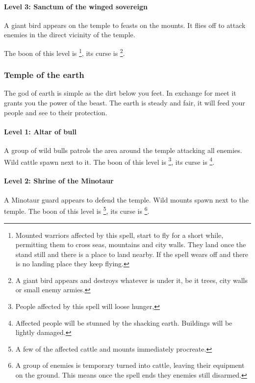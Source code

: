 \documentclass[a4paper]{book}
\begin{document}
			\paragraph{Level 3: Sanctum of the winged sovereign}
				A giant bird appears on the temple to feasts on the mounts.
				It flies off to attack enemies in the direct vicinity of the temple.

				The boon of this level is \footnote{
					Mounted warriors affected by this spell,
					start to fly for a short while,
					permitting them to cross seas, mountains and city walls.
					They land once the stand still and there is a place to land nearby.
					If the spell wears off and there is no landing place they keep flying.
				},
				its curse is \footnote{
					A giant bird appears and destroys whatever is under it,
					be it trees, city walls or small enemy armies.
				}.

		\subsubsection{Temple of the earth}
			The god of earth is simple as the dirt below you feet.
			In exchange for meet it grants you the power of the beast.
			The earth is steady and fair, it will feed your people and see to their protection.

			\paragraph{Level 1: Altar of bull}
				A group of wild bulls patrols the area around the temple attacking
				all enemies.
				Wild cattle spawn next to it.
				The boon of this level is \footnote{
					People affected by this spell will loose hunger,
				},
				its curse is \footnote{
					Affected people will be stunned by the shacking earth.
					Buildings will be lightly damaged.
				}.

			\paragraph{Level 2: Shrine of the Minotaur}
				A Minotaur guard appears to defend the temple.
				Wild mounts spawn next to the temple.
				The boon of this level is \footnote{
					A few of the affected cattle and mounts immediately procreate.
				},
				its curse is \footnote{
					A group of enemies is temporary turned into cattle,
					leaving their equipment on the ground.
					This means once the spell ends they enemies still disarmed.
				}.
\end{document}

